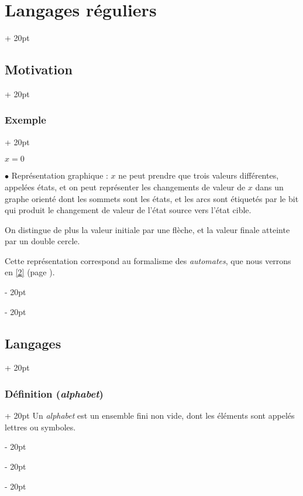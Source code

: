 \documentclass[a4paper, 12pt, twoside]{article}
\newenvironment{indalgo}[2][H]{
    \begin{minipage}{\linewidth-\leftskip-5pt}
        \begin{algorithm}[#1]
            \caption{#2}
}
{
        \end{algorithm}
    \end{minipage}
}
\newcommand{\ind}[1][20pt]{\advance\leftskip + #1}
\newcommand{\deind}[1][20pt]{\advance\leftskip - #1}
\newenvironment{indt}[2][20pt]{#2 \par \ind[#1]}{\par \deind} %
\begin{document}
\begin{indt}{\section{Langages réguliers}}
\begin{indt}{\subsection{Motivation}}
\begin{indt}{\subsubsection{Exemple}}
\begin{indalgo}{}
                    \KwRet $x = 0$\;
                \end{indalgo}

                \vspace{12pt}
                
                $\bullet$ Représentation graphique : $x$ ne peut prendre que trois valeurs différentes, appelées états, et on peut représenter les changements de valeur de $x$ dans un graphe orienté dont les sommets sont les états, et les arcs sont étiquetés par le bit qui produit le changement de valeur de l'état source vers l'état cible.

                \begin{center}
                \end{center}

                On distingue de plus la valeur initiale par une flèche, et la valeur finale atteinte par un double cercle.

                Cette représentation correspond au formalisme des \emph{automates}, que nous verrons en \ref{2} (page \pageref{2}).
            \end{indt}
        \end{indt}

        \vspace{12pt}
        
        \begin{indt}{\subsection{Langages}}
            \begin{indt}{\subsubsection{Définition (\textit{alphabet})}}
                Un \emph{alphabet} est un ensemble fini non vide, dont les éléments sont appelés lettres ou symboles.


\end{indt}
\end{indt}
\end{indt}
\end{document}
